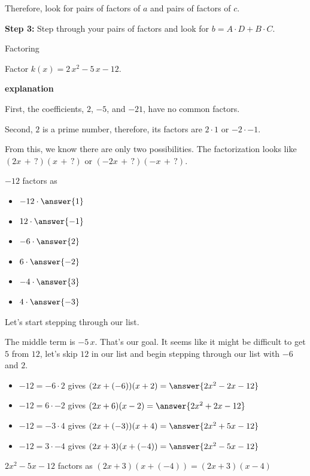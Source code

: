 \documentclass{ximera}
\begin{document}
Therefore, look for pairs of factors of $a$ and pairs of factors of $c$.






\textbf{\textcolor{blue!75!black}{Step 3:}} Step through your pairs of factors and look for $b = A \cdot D + B \cdot C$.










\begin{example} Factoring

Factor $k(x) = 2 \, x^2 - 5 \, x - 12$.


\textbf{\textcolor{red!75!green}{explanation}} 


First, the coefficients, $2$, $-5$, and $-21$, have no common factors.


Second, $2$ is a prime number, therefore, its factors are $2 \cdot 1$ or $-2 \cdot -1$.

From this, we know there are only two possibilities. The factorization looks like $(2 x \, + \, ?) (x \, + \, ?)$ or $(-2 x \, + \, ?) (-x \, + \, ?)$.






$-12$ factors as 
\begin{itemize}
\item $-12 \cdot \answer{1}$
\item $12 \cdot \answer{-1}$
\item $-6 \cdot \answer{2}$
\item $6 \cdot \answer{-2}$
\item $-4 \cdot \answer{3}$
\item $4 \cdot \answer{-3}$  
\end{itemize}



Let's start stepping through our list.

The middle term is $-5 \, x$.  That's our goal. It seems like it might be difficult to get $5$ from $12$, let's skip $12$ in our list and begin stepping through our list with $-6$ and $2$.

\begin{itemize}

\item $-12 = -6 \cdot 2$ gives $(2 x + (-6)) (x + 2) = \answer{2 x^2 - 2 x - 12}$
\item $-12 = 6 \cdot -2$ gives $(2 x + 6) (x - 2) = \answer{2 x^2 + 2 x -12}$
\item $-12 = -3 \cdot 4$ gives $(2 x + (-3)) (x + 4) = \answer{2 x^2 + 5 x - 12}$
\item $-12 = 3 \cdot -4$ gives $(2 x + 3) (x + (-4)) = \answer{2 x^2 - 5 x -12}$
\end{itemize}

$2 x^2 - 5 x - 12$ factors as $(2 x + 3) (x + (-4)) = (2 x + 3)(x - 4)$



\end{example}
\end{document}
